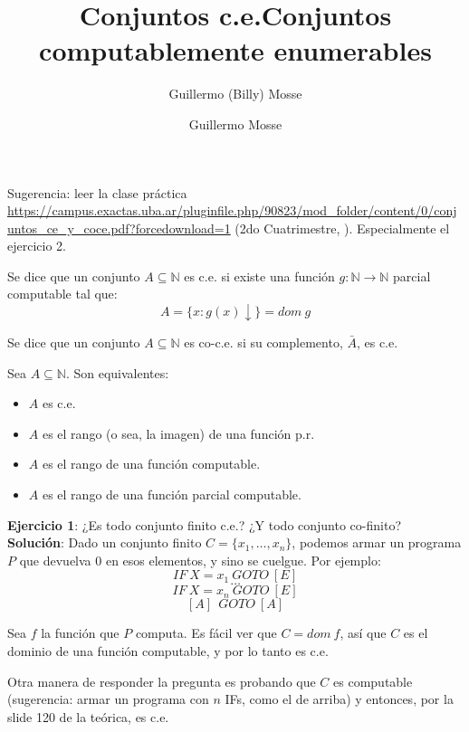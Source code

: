 \documentclass[10pt,a4paper]{article}
\author{Guillermo (Billy) Mosse}
\title{Conjuntos c.e.}
\def\key#1{\{#1\}}
\def\N{\mathbb{N}}
\begin{document}
\title{Conjuntos computablemente enumerables}
\author{Guillermo Mosse}

\maketitle


Sugerencia: leer la clase práctica \url{https://campus.exactas.uba.ar/pluginfile.php/90823/mod_folder/content/0/conjuntos_ce_y_coce.pdf?forcedownload=1} (2do Cuatrimestre, ). Especialmente el ejercicio 2.

\begin{definition}
Se dice que un conjunto $A \subseteq \N$ es c.e. si existe una función $g :\N \to \N$ parcial computable tal que:
$$A = \key{x: g(x) \downarrow } = dom\ g$$
\end{definition}

\begin{definition}
Se dice que un conjunto $A \subseteq \N$ es co-c.e. si su complemento, $\bar{A}$, es c.e.
\end{definition}

\begin{theorem}
Sea $A \subseteq \N$. Son equivalentes:
\begin{itemize}
	\item $A$ es c.e.
	\item $A$ es el rango (o sea, la imagen) de una función p.r.
	\item $A$ es el rango de una función computable.
	\item $A$ es el rango de una función parcial computable.
\end{itemize}
\end{theorem}

	\textbf{Ejercicio 1}: ¿Es todo conjunto finito c.e.? ¿Y todo conjunto co-finito?\\
	
	\textbf{Solución}: Dado un conjunto finito $C = \key{x_1,\dots,x_n}$, podemos armar un programa $P$ que devuelva $0$ en esos elementos, y sino se cuelgue. Por ejemplo:
	$$IF\ X= x_1\ GOTO\ [E]$$
	$$\dots$$
	$$IF\ X= x_n\ GOTO\ [E]$$
	$$[A]\ \ GOTO\ [A]$$
	

Sea $f$ la función que $P$ computa. Es fácil ver que $C = dom\ f$, así que $C$ es el dominio de una función computable, y por lo tanto es c.e.

Otra manera de responder la pregunta es probando que $C$ es computable (sugerencia: armar un programa con $n$ IFs, como el de arriba) y entonces, por la slide 120 de la teórica, es c.e.
\end{document}

